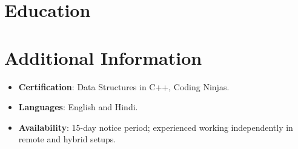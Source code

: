 \documentclass[11pt,a4paper,sans]{moderncv}
\begin{document}
\section{Education}
\vspace{1pt}


\section{Additional Information}
\vspace{1pt}
\begin{itemize}
\item {\textbf{Certification}: Data Structures in C++, Coding Ninjas.}
\item {\textbf{Languages}: English and Hindi.}
\item {\textbf{Availability}: 15-day notice period; experienced working independently in remote and hybrid setups.}
\end{itemize}
\end{document}
